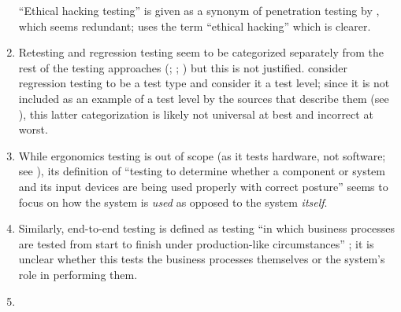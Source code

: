 \begin{enumerate}
          ``Ethical hacking testing'' is given as a synonym of penetration
          testing by \citet[p.~13\=/4]{SWEBOK2024}, which seems redundant;
          \citet[p.~28]{Gerrard2000b} uses the term ``ethical hacking'' which
          is clearer.
    \item %
          Retesting and regression testing seem to be categorized separately
          from the rest of the testing approaches (\citealp[pp.~15, 23]{IEEE2022};
          \citeyear[p.~8]{IEEE2021a}; \citeyear[p.~4]{IEEE2021b}) but this is
          not justified. \citetISTQB{} consider regression testing to be a test
          type and \citet[p.~3]{BarbosaEtAl2006} consider it a test level;
          since it is not included as an example of a test level by the sources
          that describe them (see ), this latter categorization
          is likely not universal at best and incorrect at worst.
    \item %
          While ergonomics testing is out of scope (as it tests hardware, not
          software; see ), its definition of ``testing to
          determine whether a component or system and its input devices are
          being used properly with correct posture'' \citepISTQB{} seems to
          focus on how the system is \emph{used} as opposed to the system
          \emph{itself}.
    \item %
          Similarly, end-to-end testing is defined as testing ``in which
          business processes are tested from start to finish under
          production-like circumstances'' \citepISTQB{}; it is unclear
          whether this tests the business processes themselves or the system's
          role in performing them.
    \item %

\end{enumerate}
